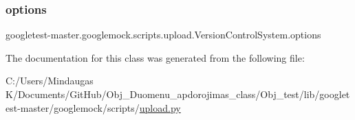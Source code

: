 \subsubsection{\texorpdfstring{options}{options}}
{\footnotesize\ttfamily googletest-\/master.\+googlemock.\+scripts.\+upload.\+Version\+Control\+System.\+options}



The documentation for this class was generated from the following file\+:\begin{DoxyCompactItemize}
\item 
C\+:/\+Users/\+Mindaugas K/\+Documents/\+Git\+Hub/\+Obj\+\_\+\+Duomenu\+\_\+apdorojimas\+\_\+class/\+Obj\+\_\+test/lib/googletest-\/master/googlemock/scripts/\mbox{\hyperlink{_obj__test_2lib_2googletest-master_2googlemock_2scripts_2upload_8py}{upload.\+py}}\end{DoxyCompactItemize}
